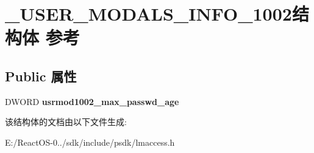 \hypertarget{struct___u_s_e_r___m_o_d_a_l_s___i_n_f_o__1002}{}\section{\+\_\+\+U\+S\+E\+R\+\_\+\+M\+O\+D\+A\+L\+S\+\_\+\+I\+N\+F\+O\+\_\+1002结构体 参考}
\label{struct___u_s_e_r___m_o_d_a_l_s___i_n_f_o__1002}
\subsection*{Public 属性}
\begin{DoxyCompactItemize}
\item 
\mbox{\label{struct___u_s_e_r___m_o_d_a_l_s___i_n_f_o__1002_abf54fe9d1641615aa8cd610170e75185}} 
D\+W\+O\+RD {\bfseries usrmod1002\+\_\+max\+\_\+passwd\+\_\+age}
\end{DoxyCompactItemize}


该结构体的文档由以下文件生成\+:\begin{DoxyCompactItemize}
\item 
E\+:/\+React\+O\+S-\/0../sdk/include/psdk/lmaccess.\+h\end{DoxyCompactItemize}
